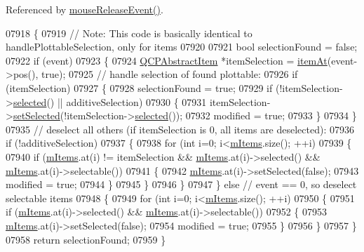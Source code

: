 Referenced by \hyperlink{a00115_source_l07691}{mouse\+Release\+Event()}.


\begin{DoxyCode}
07918 \{
07919   \textcolor{comment}{// Note: This code is basically identical to handlePlottableSelection, only for items}
07920   
07921   \textcolor{keywordtype}{bool} selectionFound = \textcolor{keyword}{false};
07922   \textcolor{keywordflow}{if} (event)
07923   \{
07924     \hyperlink{a00022}{QCPAbstractItem} *itemSelection = \hyperlink{a00116_a793e4b04e0ede11a733021907368fa83}{itemAt}(event->pos(), \textcolor{keyword}{true});
07925     \textcolor{comment}{// handle selection of found plottable:}
07926     \textcolor{keywordflow}{if} (itemSelection)
07927     \{
07928       selectionFound = \textcolor{keyword}{true};
07929       \textcolor{keywordflow}{if} (!itemSelection->\hyperlink{a00022_a225865808640d8d9a7dd19f09a2e93f2}{selected}() || additiveSelection)
07930       \{
07931         itemSelection->\hyperlink{a00022_a203de94ad586cc44d16c9565f49d3378}{setSelected}(!itemSelection->\hyperlink{a00022_a225865808640d8d9a7dd19f09a2e93f2}{selected}());
07932         modified = \textcolor{keyword}{true};
07933       \}
07934     \}
07935     \textcolor{comment}{// deselect all others (if itemSelection is 0, all items are deselected):}
07936     \textcolor{keywordflow}{if} (!additiveSelection)
07937     \{
07938       \textcolor{keywordflow}{for} (\textcolor{keywordtype}{int} i=0; i<\hyperlink{a00116_a6fcfff6ea3ccabcac8818943adb79a72}{mItems}.size(); ++i)
07939       \{
07940         \textcolor{keywordflow}{if} (\hyperlink{a00116_a6fcfff6ea3ccabcac8818943adb79a72}{mItems}.at(i) != itemSelection && \hyperlink{a00116_a6fcfff6ea3ccabcac8818943adb79a72}{mItems}.at(i)->selected() && 
      \hyperlink{a00116_a6fcfff6ea3ccabcac8818943adb79a72}{mItems}.at(i)->selectable())
07941         \{
07942           \hyperlink{a00116_a6fcfff6ea3ccabcac8818943adb79a72}{mItems}.at(i)->setSelected(\textcolor{keyword}{false});
07943           modified = \textcolor{keyword}{true};
07944         \}
07945       \}
07946     \}
07947   \} \textcolor{keywordflow}{else} \textcolor{comment}{// event == 0, so deselect selectable items}
07948   \{
07949     \textcolor{keywordflow}{for} (\textcolor{keywordtype}{int} i=0; i<\hyperlink{a00116_a6fcfff6ea3ccabcac8818943adb79a72}{mItems}.size(); ++i)
07950     \{
07951       \textcolor{keywordflow}{if} (\hyperlink{a00116_a6fcfff6ea3ccabcac8818943adb79a72}{mItems}.at(i)->selected() && \hyperlink{a00116_a6fcfff6ea3ccabcac8818943adb79a72}{mItems}.at(i)->selectable())
07952       \{
07953         \hyperlink{a00116_a6fcfff6ea3ccabcac8818943adb79a72}{mItems}.at(i)->setSelected(\textcolor{keyword}{false});
07954         modified = \textcolor{keyword}{true};
07955       \}
07956     \}
07957   \}
07958   \textcolor{keywordflow}{return} selectionFound;
07959 \}
\end{DoxyCode}


